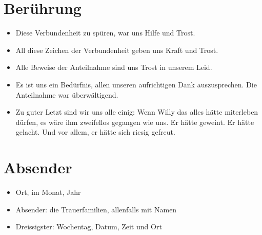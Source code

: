 \documentclass[ngerman,a4paper,11pt]{scrreprt}
\begin{document}
\section{Berührung}
\label{sec-2-1-9}

\begin{itemize}
\item Diese Verbundenheit zu spüren, war uns Hilfe und Trost.
\item All diese Zeichen der Verbundenheit geben uns Kraft und Trost.
\item Alle Beweise der Anteilnahme sind uns Trost in unserem Leid.
\item Es ist uns ein Bedürfnis, allen unseren aufrichtigen Dank
auszusprechen. Die Anteilnahme war überwältigend.
\item Zu guter Letzt sind wir uns alle einig: Wenn Willy das alles hätte
miterleben dürfen, es wäre ihm zweifellos gegangen wie uns. Er hätte
geweint. Er hätte gelacht. Und vor allem, er hätte sich riesig gefreut.
\end{itemize}

\section{Absender}
\label{sec-2-1-10}

\begin{itemize}
\item Ort, im Monat, Jahr
\item Absender: die Trauerfamilien, allenfalls mit Namen
\item Dreissigster: Wochentag, Datum, Zeit und Ort
\end{itemize}
\end{document}
